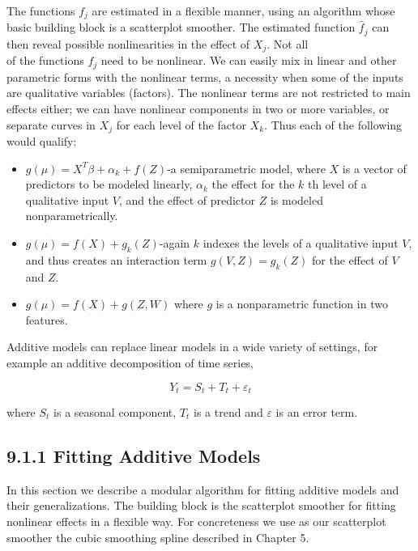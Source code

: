 \documentclass[10pt]{article}
\begin{document}
The functions $f_{j}$ are estimated in a flexible manner, using an algorithm whose basic building block is a scatterplot smoother. The estimated function $\hat{f}_{j}$ can then reveal possible nonlinearities in the effect of $X_{j}$. Not all\\
of the functions $f_{j}$ need to be nonlinear. We can easily mix in linear and other parametric forms with the nonlinear terms, a necessity when some of the inputs are qualitative variables (factors). The nonlinear terms are not restricted to main effects either; we can have nonlinear components in two or more variables, or separate curves in $X_{j}$ for each level of the factor $X_{k}$. Thus each of the following would qualify:

\begin{itemize}
  \item $g(\mu)=X^{T} \beta+\alpha_{k}+f(Z)$-a semiparametric model, where $X$ is a vector of predictors to be modeled linearly, $\alpha_{k}$ the effect for the $k$ th level of a qualitative input $V$, and the effect of predictor $Z$ is modeled nonparametrically.
  \item $g(\mu)=f(X)+g_{k}(Z)$-again $k$ indexes the levels of a qualitative input $V$, and thus creates an interaction term $g(V, Z)=g_{k}(Z)$ for the effect of $V$ and $Z$.
  \item $g(\mu)=f(X)+g(Z, W)$ where $g$ is a nonparametric function in two features.
\end{itemize}

Additive models can replace linear models in a wide variety of settings, for example an additive decomposition of time series,


\begin{equation*}
Y_{t}=S_{t}+T_{t}+\varepsilon_{t} \tag{9.5}
\end{equation*}


where $S_{t}$ is a seasonal component, $T_{t}$ is a trend and $\varepsilon$ is an error term.

\subsection*{9.1.1 Fitting Additive Models}
In this section we describe a modular algorithm for fitting additive models and their generalizations. The building block is the scatterplot smoother for fitting nonlinear effects in a flexible way. For concreteness we use as our scatterplot smoother the cubic smoothing spline described in Chapter 5.
\end{document}

